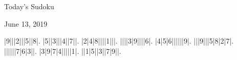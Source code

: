 \documentclass{article}
\begin{document}
\begin{center}
\Huge{Today's Sudoku}
\end{center}
\begin{center}
\Large{June 13, 2019}
\end{center}
\begin{sudoku}
|9|||2|||5||8|.
|5||3|||4||7||.
|2|4|8||||1|||.
||||3|9||||6|.
|4|5|6||||||9|.
|||9|||5|8|2|7|.
||||||7|6|3||.
|3|9|7|4|||||1|.
||1|5||3||7|9||.
\end{sudoku}
\end{document}
